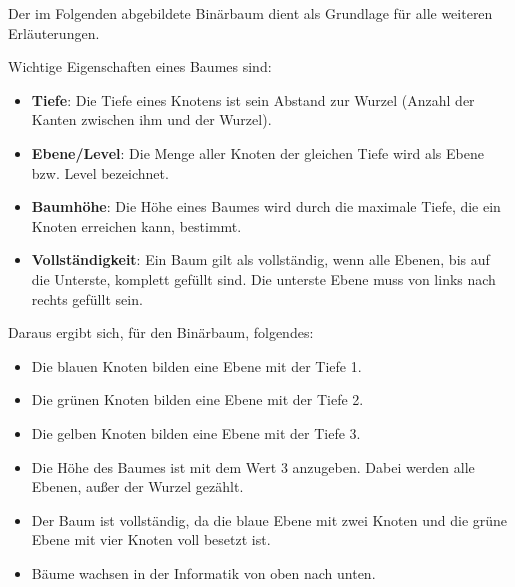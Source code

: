           Der im Folgenden abgebildete Binärbaum dient als Grundlage für alle weiteren Erläuterungen.
          \begin{center}
          \end{center}
          Wichtige Eigenschaften eines Baumes sind:
          \begin{itemize}
            \item \textbf{Tiefe}: Die Tiefe eines Knotens ist sein Abstand zur Wurzel (Anzahl der Kanten zwischen ihm und der Wurzel).
            \item \textbf{Ebene/Level}: Die Menge aller Knoten der gleichen Tiefe wird als Ebene bzw. Level bezeichnet.
            \item \textbf{Baumhöhe}: Die Höhe eines Baumes wird durch die maximale Tiefe, die ein Knoten erreichen kann, bestimmt.
            \item \textbf{Vollständigkeit}: Ein Baum gilt als vollständig, wenn alle Ebenen, bis auf die Unterste, komplett gefüllt sind. Die unterste Ebene muss von links nach rechts gefüllt sein.
          \end{itemize}
          Daraus ergibt sich, für den Binärbaum, folgendes:
          \begin{itemize}
            \item Die blauen Knoten bilden eine Ebene mit der Tiefe 1.
            \item Die grünen Knoten bilden eine Ebene mit der Tiefe 2.
            \item Die gelben Knoten bilden eine Ebene mit der Tiefe 3.
            \item Die Höhe des Baumes ist mit dem Wert 3 anzugeben. Dabei werden alle Ebenen, außer der Wurzel gezählt.
            \item Der Baum ist vollständig, da die blaue Ebene mit zwei Knoten und die grüne Ebene mit vier Knoten voll besetzt ist.
            \item Bäume wachsen in der Informatik von oben nach unten.
          \end{itemize}
